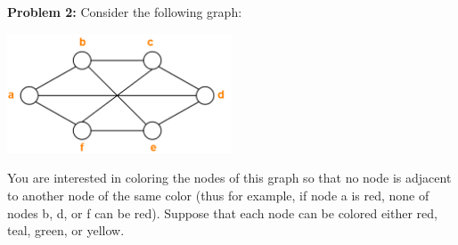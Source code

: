 \documentclass[11pt]{article}
\theoremstyle{definition}
\begin{document}
\newpage

\textbf{Problem 2:} Consider the following graph:

\begin{center}
\includegraphics[width=0.5\textwidth]{Graph.png}
\end{center}

You are interested in coloring the nodes of this graph so that no node is adjacent to another node of the same color (thus for example, if node a is red, none of nodes b, d, or f can be red). Suppose that each node can be colored either red, teal, green, or yellow. 
\end{document}
